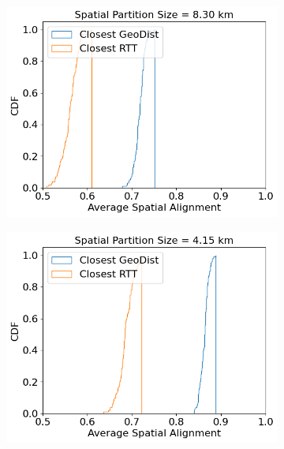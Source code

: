 \begin{figure}
\centering
\begin{subfigure}{0.45\textwidth}
  \centering
  \includegraphics[width=\linewidth]{figures/mechanisms/spatial_ctx_mgmt/spatial_alignment_randomized_4_rows.png}
  \caption{}
\end{subfigure}%
\begin{subfigure}{0.45\textwidth}
  \centering
  \includegraphics[width=\linewidth]{figures/mechanisms/spatial_ctx_mgmt/spatial_alignment_randomized_8_rows.png}
  \caption{}
\end{subfigure}\par\medskip
\begin{subfigure}{0.45\textwidth}

\end{subfigure}
\end{figure}
